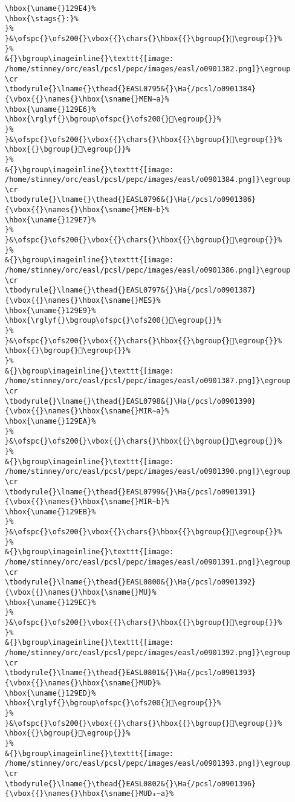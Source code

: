\begin{verbatim}
\hbox{\uname{}129E4}%
\hbox{\stags{}:}%
}%
}&\ofspc{}\ofs200{}\vbox{{}\chars{}\hbox{{}\bgroup{}𒧤\egroup{}}%
}%
&{}\bgroup\imageinline{}\texttt{[image: /home/stinney/orc/easl/pcsl/pepc/images/easl/o0901382.png]}\egroup
\cr
\tbodyrule{}\lname{}\thead{}EASL0795&{}\Ha{/pcsl/o0901384}{\vbox{{}\names{}\hbox{\sname{}MEN∼a}%
\hbox{\uname{}129E6}%
\hbox{\rglyf{}\bgroup\ofspc{}\ofs200{}𒧦\egroup{}}%
}%
}&\ofspc{}\ofs200{}\vbox{{}\chars{}\hbox{{}\bgroup{}𒧥\egroup{}}%
\hbox{{}\bgroup{}𒧦\egroup{}}%
}%
&{}\bgroup\imageinline{}\texttt{[image: /home/stinney/orc/easl/pcsl/pepc/images/easl/o0901384.png]}\egroup
\cr
\tbodyrule{}\lname{}\thead{}EASL0796&{}\Ha{/pcsl/o0901386}{\vbox{{}\names{}\hbox{\sname{}MEN∼b}%
\hbox{\uname{}129E7}%
}%
}&\ofspc{}\ofs200{}\vbox{{}\chars{}\hbox{{}\bgroup{}𒧧\egroup{}}%
}%
&{}\bgroup\imageinline{}\texttt{[image: /home/stinney/orc/easl/pcsl/pepc/images/easl/o0901386.png]}\egroup
\cr
\tbodyrule{}\lname{}\thead{}EASL0797&{}\Ha{/pcsl/o0901387}{\vbox{{}\names{}\hbox{\sname{}MES}%
\hbox{\uname{}129E9}%
\hbox{\rglyf{}\bgroup\ofspc{}\ofs200{}𒧩\egroup{}}%
}%
}&\ofspc{}\ofs200{}\vbox{{}\chars{}\hbox{{}\bgroup{}𒧨\egroup{}}%
\hbox{{}\bgroup{}𒧩\egroup{}}%
}%
&{}\bgroup\imageinline{}\texttt{[image: /home/stinney/orc/easl/pcsl/pepc/images/easl/o0901387.png]}\egroup
\cr
\tbodyrule{}\lname{}\thead{}EASL0798&{}\Ha{/pcsl/o0901390}{\vbox{{}\names{}\hbox{\sname{}MIR∼a}%
\hbox{\uname{}129EA}%
}%
}&\ofspc{}\ofs200{}\vbox{{}\chars{}\hbox{{}\bgroup{}𒧪\egroup{}}%
}%
&{}\bgroup\imageinline{}\texttt{[image: /home/stinney/orc/easl/pcsl/pepc/images/easl/o0901390.png]}\egroup
\cr
\tbodyrule{}\lname{}\thead{}EASL0799&{}\Ha{/pcsl/o0901391}{\vbox{{}\names{}\hbox{\sname{}MIR∼b}%
\hbox{\uname{}129EB}%
}%
}&\ofspc{}\ofs200{}\vbox{{}\chars{}\hbox{{}\bgroup{}𒧫\egroup{}}%
}%
&{}\bgroup\imageinline{}\texttt{[image: /home/stinney/orc/easl/pcsl/pepc/images/easl/o0901391.png]}\egroup
\cr
\tbodyrule{}\lname{}\thead{}EASL0800&{}\Ha{/pcsl/o0901392}{\vbox{{}\names{}\hbox{\sname{}MU}%
\hbox{\uname{}129EC}%
}%
}&\ofspc{}\ofs200{}\vbox{{}\chars{}\hbox{{}\bgroup{}𒧬\egroup{}}%
}%
&{}\bgroup\imageinline{}\texttt{[image: /home/stinney/orc/easl/pcsl/pepc/images/easl/o0901392.png]}\egroup
\cr
\tbodyrule{}\lname{}\thead{}EASL0801&{}\Ha{/pcsl/o0901393}{\vbox{{}\names{}\hbox{\sname{}MUD}%
\hbox{\uname{}129ED}%
\hbox{\rglyf{}\bgroup\ofspc{}\ofs200{}𒧭\egroup{}}%
}%
}&\ofspc{}\ofs200{}\vbox{{}\chars{}\hbox{{}\bgroup{}𒧭\egroup{}}%
\hbox{{}\bgroup{}𒧮\egroup{}}%
}%
&{}\bgroup\imageinline{}\texttt{[image: /home/stinney/orc/easl/pcsl/pepc/images/easl/o0901393.png]}\egroup
\cr
\tbodyrule{}\lname{}\thead{}EASL0802&{}\Ha{/pcsl/o0901396}{\vbox{{}\names{}\hbox{\sname{}MUD₃∼a}%

\end{verbatim}
